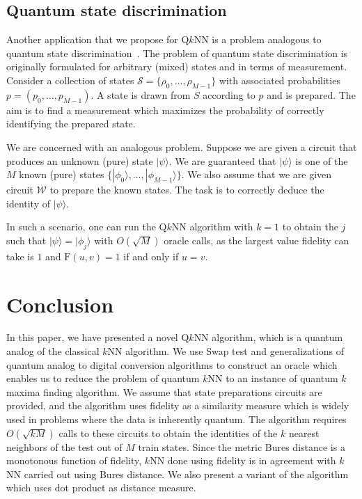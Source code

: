 \documentclass[a4paper,twocolumn,11pt,unpublished]{quantumarticle}
\newcommand{\rang}{\rangle}
\begin{document}
    
    
    \subsection{Quantum state discrimination}
    Another application that we propose for  Q$k$NN is a problem analogous to quantum state discrimination~\cite{Bae2015}. The problem of quantum state discrimination is originally formulated for arbitrary (mixed) states and in terms of measurement. Consider a collection of states $\mathcal S = \{\rho_0, \ldots, \rho_{M-1}\}$ with associated probabilities $p = (p_0, \ldots, p_{M-1})$. A state is drawn from $S$ according to $p$ and is prepared. The aim is to find a measurement which maximizes the probability of correctly identifying the prepared state.  
    
    We are concerned with an analogous problem. Suppose we are given a circuit that produces an unknown (pure) state $|\psi\rang$. We are guaranteed that $|\psi\rang$ is one of the $M$ known (pure) states $\{|\phi_0\rang, \ldots, |\phi_{M-1}\rang\}$. We also assume that we are given circuit $\mathcal{W}$ to prepare the known states. The task is to correctly deduce the identity of $|\psi\rang$. 
    
    In such a scenario, one can run the  Q$k$NN algorithm with $k=1$ to obtain the $j$ such that $|\psi\rang = |\phi_j\rang$ with $ O(\sqrt{M})$ oracle calls, as the largest value fidelity can take is $1$ and $\text{F}(u,v) = 1$ if and only if $u=v$.

\section{Conclusion}\label{sec:conclusion}
    In this paper, we have presented a novel Q$k$NN algorithm, which is a quantum analog of the classical $k$NN algorithm. We use Swap test and generalizations of quantum analog to digital conversion algorithms to construct an oracle which enables us to reduce the problem of quantum $k$NN to an instance of quantum $k$ maxima finding algorithm. We assume that state preparations circuits are provided, and the algorithm uses fidelity as a similarity measure which is widely used in problems where the data is inherently quantum. The algorithm requires $O(\sqrt{kM})$ calls to these circuits to obtain the identities of the $k$ nearest neighbors of the test out of $M$ train states. Since the metric Bures distance is a monotonous function of fidelity, $k$NN done using fidelity is in agreement with $k$NN carried out using Bures distance. We also present a variant of the algorithm which uses dot product as distance measure. 
    
\end{document}
